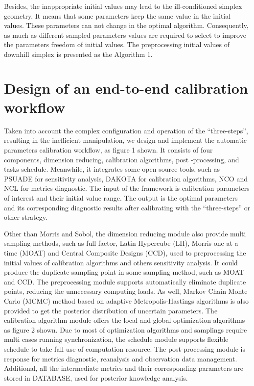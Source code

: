 \documentclass[gmd, manuscript]{copernicus}
\begin{document}
Besides, the inappropriate  initial values may lead to the ill-conditioned simplex geometry. It
means that some parameters keep the same value in the initial values. These parameters can not
change in the optimal algorithm. Consequently, as much as different sampled parameters values are
required to select to improve the parameters freedom of initial values. The preprocessing initial 
values of downhill simplex is presented as the Algorithm 1. 


\section{Design of an end-to-end calibration workflow}
Taken into account the complex configuration and operation of the ``three-steps'', resulting in the
inefficient manipulation,  we design and implement the automatic parameters calibration workflow,
as figure 1 shown. It consists of four components, dimension reducing, calibration algorithms, post
-processing, and tasks schedule. Meanwhile, it integrates some open source tools, such as PSUADE
for sensitivity analysis, DAKOTA for calibration algorithms, NCO and NCL for metrics diagnostic. 
The input of the framework is calibration parameters of interest and their initial value range. The
output is the optimal parameters and its corresponding diagnostic results after calibrating with
the ``three-steps'' or other strategy.

Other than Morris and Sobol, the dimension reducing module also provide multi sampling methods,
such as full factor, Latin Hypercube (LH),  Morris one-at-a-time (MOAT)  and Central Composite Designs (CCD), used to preprocessing the initial values of calibration
algorithms and others sensitivity analysis. It could produce the duplicate sampling point in some sampling method, such as MOAT and CCD. The preprocessing module supports automatically eliminate duplicate points, reducing the unnecessary computing loads. As well, Markov Chain Monte Carlo (MCMC) method  based
on adaptive Metropolis-Hastings algorithms is also provided to get the posterior distribution of
uncertain parameters.  The calibration algorithm module offers the local and global optimization
algorithms as figure 2 shown. Due to most of optimization algorithms and samplings require multi
cases running synchronization, the schedule module supports flexible schedule to take fall use of
computation resource. The post-processing module is response for metrics diagnostic, reanalysis and
observation data management. Additional, all the intermediate metrics and their corresponding
parameters are stored in DATABASE, used for posterior knowledge analysis.
\end{document}
